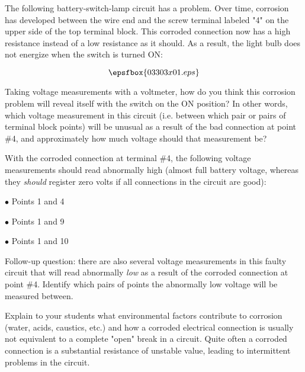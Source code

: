 

The following battery-switch-lamp circuit has a problem.  Over time, corrosion has developed between the wire end and the screw terminal labeled "4" on the upper side of the top terminal block.  This corroded connection now has a high resistance instead of a low resistance as it should.  As a result, the light bulb does not energize when the switch is turned ON:

$$\epsfbox{03303x01.eps}$$

Taking voltage measurements with a voltmeter, how do you think this corrosion problem will reveal itself with the switch on the ON position?  In other words, which voltage measurement in this circuit (i.e. between which pair or pairs of terminal block points) will be unusual as a result of the bad connection at point \#4, and approximately how much voltage should that measurement be?







With the corroded connection at terminal \#4, the following voltage measurements should read abnormally high (almost full battery voltage, whereas they {\it should} register zero volts if all connections in the circuit are good):

\medskip
\goodbreak
\item{$\bullet$} Points 1 and 4
\item{$\bullet$} Points 1 and 9
\item{$\bullet$} Points 1 and 10
\medskip

\vskip 10pt

Follow-up question: there are also several voltage measurements in this faulty circuit that will read abnormally {\it low} as a result of the corroded connection at point \#4.  Identify which pairs of points the abnormally low voltage will be measured between.







Explain to your students what environmental factors contribute to corrosion (water, acids, caustics, etc.) and how a corroded electrical connection is usually not equivalent to a complete "open" break in a circuit.  Quite often a corroded connection is a substantial resistance of unstable value, leading to intermittent problems in the circuit.




